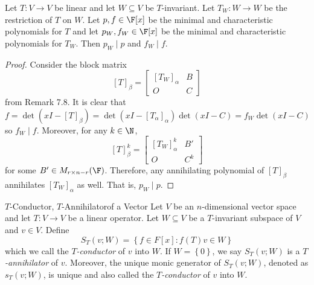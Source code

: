 \documentclass[linearalgebra]{subfiles}
\begin{document}
    \begin{prop}{}
        Let $T:V\to V$ be linear and let $W\subseteq V$ be $T$-invariant. Let $T_W:W\to W$ be the restriction of $T$ on $W$. Let $p,f\in\F[x]$ be the minimal and characteristic polynomials for $T$ and let $p_W,f_W\in\F[x]$ be the minimal and characteristic polynomials for $T_W$. Then $p_W\mid p$ and $f_W\mid f$.
    \end{prop}

    \begin{proof}
        Consider the block matrix
        \begin{equation*}
            \left[ T \right]_\beta = \begin{bmatrix} \left[ T_W \right] _\alpha & B \\ O & C \end{bmatrix}
        \end{equation*}
        from Remark 7.8. It is clear that
        \begin{equation*}
            f = \det\left( xI-\left[ T \right] _\beta \right) = \det\left( xI-\left[ T_\alpha \right] _\alpha \right) \det\left( xI-C \right) = f_W\det\left( xI-C \right) 
        \end{equation*}
        so $f_W\mid f$. Moreover, for any $k\in\N$,
        \begin{equation*}
            \left[ T \right]_\beta^k = \begin{bmatrix} \left[ T_W \right] _\alpha^k & B' \\ O & C^k \end{bmatrix}
        \end{equation*}
        for some $B'\in M_{r\times n-r}(\F)$. Therefore, any annihilating polynomial of $\left[ T \right] _\beta$ annihilates $\left[ T_W \right] _\alpha$ as well. That is, $p_W\mid p$.
    \end{proof}

    \begin{definition}{$T$-Conductor, $T$-Annihilator}{of a Vector}
        Let $V$ be an $n$-dimensional vector space and let $T:V\to V$ be a linear operator. Let $W\subseteq V$ be a $T$-invariant subspace of $V$ and $v\in V$. Define
        \begin{equation*}
            S_T (v; W) = \left\lbrace f\in F[x]: f(T)v \in W \right\rbrace
        \end{equation*}
        which we call the \emph{$T$-conductor} of $v$ into $W$. If $W = \left\lbrace 0 \right\rbrace$, we say $S_T(v; W)$ is a \emph{$T$-annihilator} of $v$. Moreover, the unique monic generator of $S_T(v; W)$, denoted as $s_T(v; W)$, is unique and also called the \emph{$T$-conductor} of $v$ into $W$.
    \end{definition}
\end{document}
